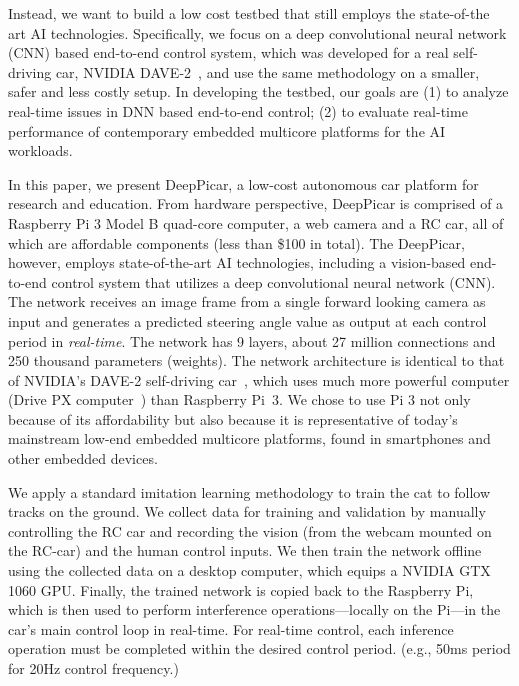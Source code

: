 Instead, we want to build a low cost testbed that still employs the
state-of-the art AI technologies. Specifically, we focus on a deep
convolutional neural network (CNN) based end-to-end control system,
which was developed for a real self-driving car, NVIDIA
DAVE-2~\cite{Bojarski2016}, and use the same methodology on a
smaller, safer and less costly setup. In developing the testbed, our
goals are (1) to analyze real-time issues in DNN based end-to-end
control; (2) to evaluate real-time performance of contemporary embedded
multicore platforms for the AI workloads.

In this paper, we present DeepPicar, a low-cost autonomous car
platform for research and education. From hardware perspective,
DeepPicar is comprised of a Raspberry Pi 3 Model B quad-core
computer, a web camera and a RC car, all of which are affordable
components (less than \$100 in total).
The DeepPicar, however, employs state-of-the-art AI
technologies, including a vision-based end-to-end control system that
utilizes a deep convolutional neural network (CNN).
The network receives an image frame from a single forward
looking camera as input and generates a predicted steering angle
value as output at each control period in \emph{real-time}.
The network has 9 layers, about 27 million connections
and 250 thousand parameters (weights).
The network architecture is identical to that of NVIDIA's DAVE-2
self-driving car~\cite{Bojarski2016}, which uses much more powerful
computer (Drive PX computer~\cite{drivepx}) than Raspberry Pi~3.
We chose to use Pi 3 not only because of its
affordability but also because it is representative
of today's mainstream low-end embedded multicore platforms, found in
smartphones and other embedded devices.


We apply a standard imitation learning methodology to train the cat to
follow tracks on the ground. We collect data for
training and validation by manually
controlling the RC car and recording the vision (from the webcam
mounted on the RC-car) and the human control inputs. We then train the
network offline using the collected data on a desktop computer, which
equips a NVIDIA GTX 1060 GPU. Finally, the trained network is copied
back to the Raspberry Pi, which is then used to perform interference
operations---locally on the Pi---in the car's main control loop in
real-time. For real-time control, each inference operation must
be completed within the desired control period. (e.g., 50ms period for
20Hz control frequency.)

